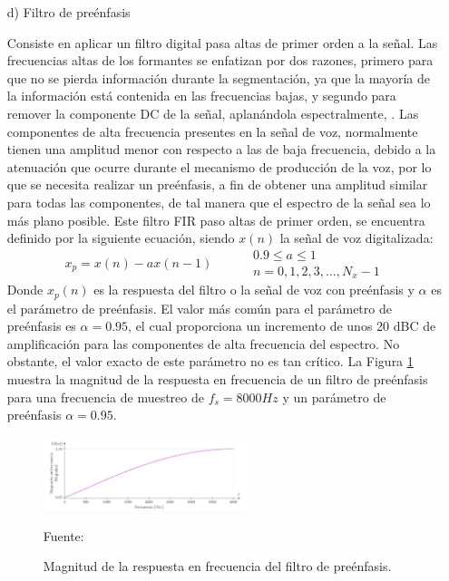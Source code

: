 \begin{enumerate}
\item[d)]Filtro de preénfasis
\par
Consiste en aplicar un filtro digital pasa altas de primer orden a la señal. Las frecuencias altas de los formantes se enfatizan por dos razones, primero para que no se pierda información durante la segmentación, ya que la mayoría de la información está contenida en las frecuencias bajas, y segundo para remover la componente DC de la señal, aplanándola espectralmente, \cite{stephen}.
\vskip 0.5cm
Las componentes de alta frecuencia presentes en la señal de voz, normalmente tienen una amplitud menor con respecto a las de baja frecuencia, debido a la atenuación que ocurre durante el mecanismo de producción de la voz, por lo que se necesita realizar un preénfasis, a fin de obtener una amplitud similar para todas las componentes, de tal manera que el espectro de la señal sea lo más plano posible. Este filtro FIR paso altas de primer orden, se encuentra definido por la siguiente ecuación, siendo $x(n)$ la señal de voz digitalizada:
\begin{equation}
\label{eq:ecuacion32}
x_{p} = x(n) - ax(n-1)\qquad
\begin{aligned}
& 0.9 \leq a \leq 1 \\
& n = 0,1,2,3,...,N_{x} - 1
\end{aligned}
\end{equation}
Donde $x_{p}(n)$ es la respuesta del filtro o la señal de voz con preénfasis y $\alpha$ es el parámetro de preénfasis. El valor más común para el parámetro de preénfasis es $\alpha = 0.95$, el cual proporciona un incremento de unos 20 dBC de amplificación para las componentes de alta frecuencia del espectro. No obstante, el valor exacto de este parámetro no es tan crítico. La Figura \ref{fig:figura2.31} muestra la magnitud de la respuesta en frecuencia de un filtro de preénfasis para una frecuencia de muestreo de $f_{s} = 8000 Hz$ y un parámetro de preénfasis $\alpha = 0.95$.

\begin{figure}[ht]
\begin{center}
\includegraphics[width=0.56\textwidth]{Imagenes/Cap2/image032}
\end{center}
\begin{center}
\vskip -0.5cm
\caption{\small{Magnitud de la respuesta en frecuencia del filtro de preénfasis.}}
\label{fig:figura2.31}
{\small{Fuente: \cite{eyra}}}
\end{center}
\end{figure}


\end{enumerate}
